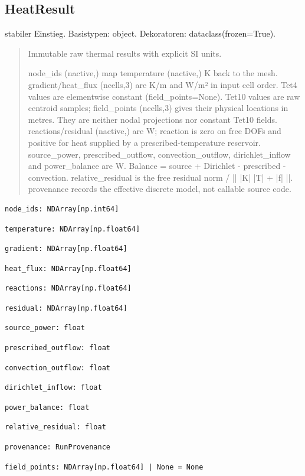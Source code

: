 \subsection{HeatResult}
stabiler Einstieg.
Basistypen: object. Dekoratoren: dataclass(frozen=True).
\begin{quote}
Immutable raw thermal results with explicit SI units.\par node\_ids (nactive,) map temperature (nactive,) K back to the mesh. gradient/heat\_flux (ncells,3) are K/m and W/m² in input cell order. Tet4 values are elementwise constant (field\_points=None). Tet10 values are raw centroid samples; field\_points (ncells,3) gives their physical locations in metres. They are neither nodal projections nor constant Tet10 fields. reactions/residual (nactive,) are W; reaction is zero on free DOFs and positive for heat supplied by a prescribed-temperature reservoir. source\_power, prescribed\_outflow, convection\_outflow, dirichlet\_inflow and power\_balance are W. Balance = source + Dirichlet - prescribed - convection. relative\_residual is the free residual norm / || |K| |T| + |f| ||. provenance records the effective discrete model, not callable source code.
\end{quote}
\begin{lstlisting}
node_ids: NDArray[np.int64]
\end{lstlisting}
\begin{lstlisting}
temperature: NDArray[np.float64]
\end{lstlisting}
\begin{lstlisting}
gradient: NDArray[np.float64]
\end{lstlisting}
\begin{lstlisting}
heat_flux: NDArray[np.float64]
\end{lstlisting}
\begin{lstlisting}
reactions: NDArray[np.float64]
\end{lstlisting}
\begin{lstlisting}
residual: NDArray[np.float64]
\end{lstlisting}
\begin{lstlisting}
source_power: float
\end{lstlisting}
\begin{lstlisting}
prescribed_outflow: float
\end{lstlisting}
\begin{lstlisting}
convection_outflow: float
\end{lstlisting}
\begin{lstlisting}
dirichlet_inflow: float
\end{lstlisting}
\begin{lstlisting}
power_balance: float
\end{lstlisting}
\begin{lstlisting}
relative_residual: float
\end{lstlisting}
\begin{lstlisting}
provenance: RunProvenance
\end{lstlisting}
\begin{lstlisting}
field_points: NDArray[np.float64] | None = None
\end{lstlisting}
